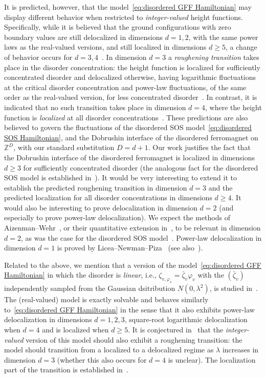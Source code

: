 \documentclass[11pt, reqno]{amsart}
\newcommand{\Z}{\mathbb{Z}}
\numberwithin{equation}{section}
\begin{document}
It is predicted, however, that the model~\eqref{eq:disordered GFF Hamiltonian} may display different behavior when restricted to \emph{integer-valued} height functions. Specifically, while it is believed that the ground configurations with zero boundary values are still delocalized in dimensions $d=1,2$, with the same power laws as the real-valued versions, and still localized in dimensions $d\ge 5$, a change of behavior occurs for $d=3,4$~\cites{HH85, F86, BG92, EN98}. In dimension $d=3$ a \emph{roughening transition} takes place in the disorder concentration: the height function is localized for sufficiently concentrated disorder and delocalized otherwise, having logarithmic fluctuations at the critical disorder concentration and power-law fluctuations, of the same order as the real-valued version, for less concentrated disorder~\cite{EN98}. In contrast, it is indicated that no such transition takes place in dimension $d=4$, where the height function is \emph{localized} at all disorder concentrations~\cite{EN98}. These predictions are also believed to govern the fluctuations of the disordered SOS model~\eqref{eq:disordered SOS Hamiltonian}, and the Dobrushin interface of the disordered ferromagnet on $\Z^D$, with our standard substitution $D=d+1$. Our work justifies the fact that the Dobrushin interface of the disordered ferromagnet is localized in dimensions $d\ge 3$ for sufficiently concentrated disorder (the analogous fact for the disordered SOS model is established in~\cite{BK}). It would be very interesting to extend it to establish the predicted roughening transition in dimension $d=3$ and the predicted localization for all disorder concentrations in dimensions $d\ge 4$. It would also be interesting to prove delocalization in dimension $d=2$ (and especially to prove power-law delocalization). We expect the methods of Aizenman--Wehr~\cite{AW90}, or their quantitative extension in~\cite{DHP21}, to be relevant in dimension $d=2$, as was the case for the disordered SOS model~\cite{BK96}. Power-law delocalization in dimension $d=1$ is proved by Licea--Newman--Piza~\cite{LNP96} (see also~\cites{DEP22, DEP23}).

Related to the above, we mention that a version of the model~\eqref{eq:disordered GFF Hamiltonian} in which the disorder is \emph{linear}, i.e., $\zeta_{v,\varphi_v} = \bar{\zeta}_v\varphi_v$ with the $(\bar{\zeta}_v)$ independently sampled from the Gaussian dsitribution $N(0,\lambda^2)$, is studied in~\cite{DHP23}. The (real-valued) model is exactly solvable and behaves similarly to~\eqref{eq:disordered GFF Hamiltonian} in the sense that it also exhibits power-law delocalization in dimensions $d=1,2,3$, square-root logarithmic delocalization when $d=4$ and is localized when $d\ge 5$. It is conjectured in~\cite{DHP23} that the \emph{integer-valued} version of this model should also exhibit a roughening transition: the model should transition from a localized to a delocalized regime as $\lambda$ increases in dimension $d=3$ (whether this also occurs for $d=4$ is unclear). The localization part of the transition is established in~\cite{DHP23}.
\end{document}

